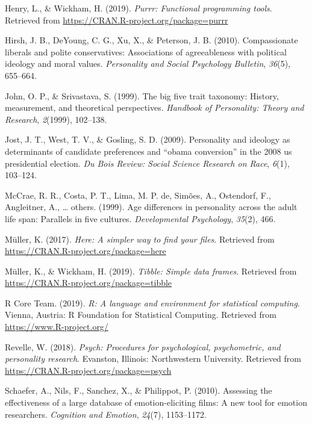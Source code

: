 \documentclass[man]{apa6}
\begin{document}
\leavevmode\hypertarget{ref-R-purrr}{}%
Henry, L., \& Wickham, H. (2019). \emph{Purrr: Functional programming tools}. Retrieved from \url{https://CRAN.R-project.org/package=purrr}

\leavevmode\hypertarget{ref-hirsh2010compassionate}{}%
Hirsh, J. B., DeYoung, C. G., Xu, X., \& Peterson, J. B. (2010). Compassionate liberals and polite conservatives: Associations of agreeableness with political ideology and moral values. \emph{Personality and Social Psychology Bulletin}, \emph{36}(5), 655--664.

\leavevmode\hypertarget{ref-john1999big}{}%
John, O. P., \& Srivastava, S. (1999). The big five trait taxonomy: History, measurement, and theoretical perspectives. \emph{Handbook of Personality: Theory and Research}, \emph{2}(1999), 102--138.

\leavevmode\hypertarget{ref-jost2009personality}{}%
Jost, J. T., West, T. V., \& Gosling, S. D. (2009). Personality and ideology as determinants of candidate preferences and ``obama conversion'' in the 2008 us presidential election. \emph{Du Bois Review: Social Science Research on Race}, \emph{6}(1), 103--124.

\leavevmode\hypertarget{ref-mccrae1999age}{}%
McCrae, R. R., Costa, P. T., Lima, M. P. de, Simões, A., Ostendorf, F., Angleitner, A., \ldots{} others. (1999). Age differences in personality across the adult life span: Parallels in five cultures. \emph{Developmental Psychology}, \emph{35}(2), 466.

\leavevmode\hypertarget{ref-R-here}{}%
Müller, K. (2017). \emph{Here: A simpler way to find your files}. Retrieved from \url{https://CRAN.R-project.org/package=here}

\leavevmode\hypertarget{ref-R-tibble}{}%
Müller, K., \& Wickham, H. (2019). \emph{Tibble: Simple data frames}. Retrieved from \url{https://CRAN.R-project.org/package=tibble}

\leavevmode\hypertarget{ref-R-base}{}%
R Core Team. (2019). \emph{R: A language and environment for statistical computing}. Vienna, Austria: R Foundation for Statistical Computing. Retrieved from \url{https://www.R-project.org/}

\leavevmode\hypertarget{ref-R-psych}{}%
Revelle, W. (2018). \emph{Psych: Procedures for psychological, psychometric, and personality research}. Evanston, Illinois: Northwestern University. Retrieved from \url{https://CRAN.R-project.org/package=psych}

\leavevmode\hypertarget{ref-schaefer2010}{}%
Schaefer, A., Nils, F., Sanchez, X., \& Philippot, P. (2010). Assessing the effectiveness of a large database of emotion-eliciting films: A new tool for emotion researchers. \emph{Cognition and Emotion}, \emph{24}(7), 1153--1172.
\end{document}
